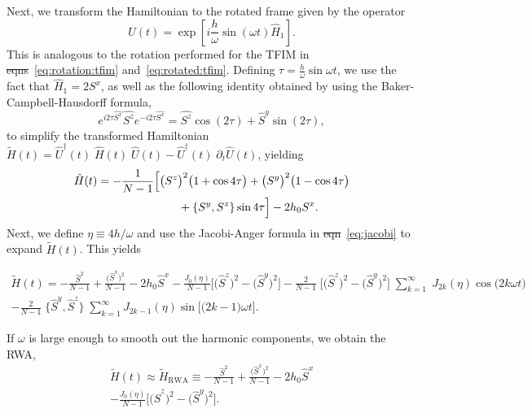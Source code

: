 \documentclass[%
reprint,
superscriptaddress,
amsmath,amssymb,
aps,
prb,
showkeys,
]{revtex4-2}
\providecommand{\DIFaddtex}[1]{{\protect\color{blue}\uwave{#1}}} %
\providecommand{\DIFdeltex}[1]{{\protect\color{red}\sout{#1}}}                      %
\providecommand{\DIFaddbegin}{} %
\providecommand{\DIFaddend}{} %
\providecommand{\DIFdelbegin}{} %
\providecommand{\DIFdelend}{} %
\providecommand{\DIFadd}[1]{\texorpdfstring{\DIFaddtex{#1}}{#1}} %
\providecommand{\DIFdel}[1]{\texorpdfstring{\DIFdeltex{#1}}{}} %
\newcommand{\DIFscaledelfig}{0.5}
\newlength{\DIFdelgraphicswidth} %
\newlength{\DIFdelgraphicsheight} %
\newcommand{\DIFaddincludegraphics}[2][]{{\color{blue}\fbox{\DIFOincludegraphics[#1]{#2}}}} %
\newcommand{\DIFdelincludegraphics}[2][]{%
\sbox{\DIFdelgraphicsbox}{\DIFOincludegraphics[#1]{#2}}%
\settoboxwidth{\DIFdelgraphicswidth}{\DIFdelgraphicsbox} %
\settoboxtotalheight{\DIFdelgraphicsheight}{\DIFdelgraphicsbox} %
\scalebox{\DIFscaledelfig}{%
\parbox[b]{\DIFdelgraphicswidth}{\usebox{\DIFdelgraphicsbox}\\[-\baselineskip] \rule{\DIFdelgraphicswidth}{0em}}\llap{\resizebox{\DIFdelgraphicswidth}{\DIFdelgraphicsheight}{%
\setlength{\unitlength}{\DIFdelgraphicswidth}%
\begin{picture}(1,1)%
\thicklines\linethickness{2pt} %
{\color[rgb]{1,0,0}\put(0,0){\framebox(1,1){}}}%
{\color[rgb]{1,0,0}\put(0,0){\line( 1,1){1}}}%
{\color[rgb]{1,0,0}\put(0,1){\line(1,-1){1}}}%
\end{picture}%
}\hspace*{3pt}}} %
} %
\DeclareRobustCommand{\DIFaddbegin}{\DIFOaddbegin \let\includegraphics\DIFaddincludegraphics} %
\DeclareRobustCommand{\DIFaddend}{\DIFOaddend \let\includegraphics\DIFOincludegraphics} %
\DeclareRobustCommand{\DIFdelbegin}{\DIFOdelbegin \let\includegraphics\DIFdelincludegraphics} %
\DeclareRobustCommand{\DIFdelend}{\DIFOaddend \let\includegraphics\DIFOincludegraphics} %
\begin{document}
Next, we transform the Hamiltonian to the rotated frame given by the operator
\begin{equation}
	\hat{U}(t)=\exp [i \frac{h}{\omega} \sin (\omega t) \hat{H}_{1}].
\end{equation}
This is analogous to the rotation performed for the TFIM in \DIFdelbegin \DIFdel{eqns}\DIFdelend \DIFaddbegin \DIFadd{eqs.}\DIFaddend ~\ref{eq:rotation:tfim} and~\ref{eq:rotated:tfim}. Defining $\tau = \displaystyle\frac{h}{\omega}\sin{\omega t}$, we use the fact that $\hat{H}_1 = 2 S^x$, as well as the following identity obtained by using the Baker-Campbell-Hausdorff formula,
\begin{equation}
	e^{i 2\tau\hat{S^{x}}} \hat{S^{z}} e^{-i 2\tau \hat{S^{x}}}=\hat{S^{z}} \cos \left(2\tau\right)+\hat{S}^{y} \sin (2\tau),
\end{equation}
to simplify the transformed Hamiltonian $\tilde{H}(t) = \hat{U}^\dagger(t)\;\hat{H}(t)\;\hat{U}(t) - \hat{U}^\dagger(t)\;\partial_t\hat{U}(t)$, yielding
\begin{align}
	\label{eq:lmg_rotated}
	\tilde{H}(t)& = -\frac{1}{N-1}\Big[\big(S^z\big)^2 \big(1+\cos{4\tau}\big)+ \big(S^y\big)^2 \big(1-\cos{4\tau}\big)\nonumber \\  
	&\hskip 2.5cm + \pb{S^y}{S^z}
	\sin{4\tau}\Big] - 2 h_0 S^x.
\end{align}
Next, we define $\eta\equiv 4h/\omega$ and use the Jacobi-Anger formula in \DIFdelbegin \DIFdel{eqn}\DIFdelend \DIFaddbegin \DIFadd{eq.}\DIFaddend ~\ref{eq:jacobi}
to expand $\tilde{H}(t)$. This yields
\begin{widetext}
	\begin{multline}
		\label{eq:lmg_jacobiexp}
		\tilde{H}(t)= -\frac{\hat{S}^2}{N-1} +  \frac{\big(\hat{S}^x\big)^{2}}{N-1} - 2h_0 \hat{S}^x - \frac{J_0(\eta)}{N-1}\bigg[\big(\hat{S}^z\big)^{2} - \big(\hat{S}^y\big)^{2} \bigg] - \frac{2}{N-1}\;\Big[\big( \hat{S}^z\big)^2 - \big( \hat{S}^y\big)^2\Big]\;\sum^\infty_{k=1}\;J_{2k}(\eta)\cos{\big(2k\omega t\big)}\\
		- \frac{2}{N-1}\;\big\{ \hat{S}^y,  \hat{S}^z \big\}\;\sum^\infty_{k=1}J_{2k-1}(\eta)  \sin{\Big[\big(2k-1\big)\omega t\Big]}.
	\end{multline}
\end{widetext}
If $\omega$ is large enough to smooth out the harmonic components, we obtain the RWA,
\begin{multline}
	\tilde{H}(t)\approx \tilde{H}_{\mathrm{RWA}}\equiv -\frac{\hat{S}^2}{N-1} +  \frac{\big(\hat{S}^x\big)^{2}}{N-1} - 2h_0 \hat{S}^x\\
	- \frac{J_0(\eta)}{N-1}\bigg[\big(\hat{S}^z\big)^{2} - \big(\hat{S}^y\big)^{2} \bigg].
	\label{eq:lmg_rwa}
\end{multline}
\end{document}
